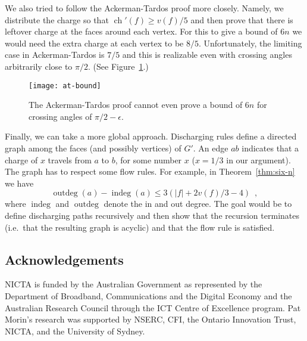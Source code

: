 \documentclass{patmorin}
\DeclareMathOperator{\ch}{ch}
\DeclareMathOperator{\ind}{indeg}
\DeclareMathOperator{\outd}{outdeg}
\newcommand{\figlabel}[1]{\label{fig:#1}}
\newcommand{\figref}[1]{\mbox{Figure~\ref{fig:#1}}}
\begin{document}
We also tried to follow the Ackerman-Tardos proof more closely. Namely, we
distribute the charge so that $\ch'(f)\ge v(f)/5$ and then prove that there
is leftover charge at the faces around each vertex.  For this to give a
bound of $6n$ we would need the extra charge at each vertex to be $8/5$.
Unfortunately, the limiting case in Ackerman-Tardos is $7/5$ and this is
realizable even with crossing angles arbitrarily close to $\pi/2$.
(See \figref{at-bound}.)

\begin{figure}
  \begin{center}
    \texttt{[image: at-bound]}
  \end{center}
  \caption{The Ackerman-Tardos proof cannot even prove a bound of $6n$ for
          crossing angles of $\pi/2-\epsilon$.}
  \figlabel{at-bound}
\end{figure}

Finally, we can take a more global approach.  Discharging rules define a
directed graph among the faces (and possibly vertices) of $G'$.  An edge
$ab$ indicates that a charge of $x$ travels from $a$ to $b$, for some
number $x$ ($x=1/3$ in our argument).  The graph has to respect some flow
rules.  For example, in Theorem~\ref{thm:six-n} we have
\[
    \outd(a) - \ind(a) \le 3(|f| + 2v(f)/3 - 4) \enspace ,
\]
where $\ind$ and $\outd$ denote the in and out degree.  The goal would be
to define discharging paths recursively and then show that the recursion
terminates (i.e.~that the resulting graph is acyclic) and that the flow rule is satisfied.


\subsection*{Acknowledgements}
NICTA is funded by the Australian Government as represented by the
Department of Broadband, Communications and the Digital Economy and the
Australian Research Council through the ICT Centre of Excellence program.
Pat Morin's research was supported by NSERC, CFI, the Ontario Innovation Trust, NICTA, and the University of Sydney.


\end{document}
